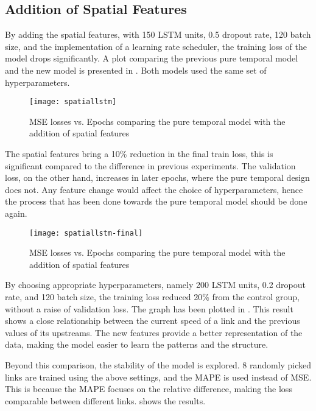 \subsection{Addition of Spatial Features}

By adding the spatial features, with 150 LSTM units, 0.5 dropout rate, 120 batch size, and the implementation of a learning rate scheduler, the training loss of the model drops significantly. 
A plot comparing the previous pure temporal model and the new model is presented in . Both models used the same set of hyperparameters.

\begin{figure}[!htb]
    \centering
    \texttt{[image: spatiallstm]}
    \caption{MSE losses vs. Epochs comparing the pure temporal model with the addition of spatial features}
    \label{Figure:spatiallstm}
\end{figure}

The spatial features bring a 10\% reduction in the final train loss, this is significant compared to the difference in previous experiments. 
The validation loss, on the other hand, increases in later epochs, where the pure temporal design does not. 
Any feature change would affect the choice of hyperparameters, hence the process that has been done towards the pure temporal model should be done again. 

\begin{figure}[!htb]
    \centering
    \texttt{[image: spatiallstm-final]}
    \caption{MSE losses vs. Epochs comparing the pure temporal model with the addition of spatial features}
    \label{Figure:spatiallstm-final}
\end{figure}

By choosing appropriate hyperparameters, namely 200 LSTM units, 0.2 dropout rate, and 120 batch size, the training loss  reduced 20\% from the control group, without a raise of validation loss. 
The graph has been plotted in .
This result shows a close relationship between the current speed of a link and the previous values of its upstreams.
The new features provide a better representation of the data, making the model easier to learn the patterns and the structure. 

Beyond this comparison, the stability of the model is explored. 
8 randomly picked links are trained using the above settings, and the MAPE is used instead of MSE. 
This is because the MAPE focuses on the relative difference, making the loss comparable between different links. 
 shows the results. 

